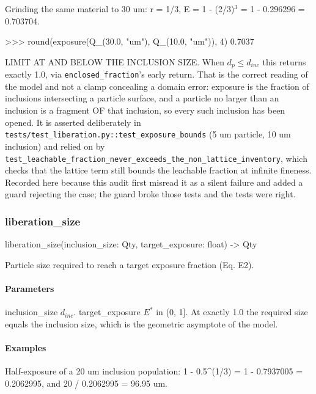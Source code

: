 \documentclass[10pt,a4paper,twoside]{report}
\begin{document}
Grinding the same material to 30 um: r = 1/3, E = 1 - (2/3)$^{3}$ = 1 - 0.296296 = 0.703704.

\begin{doctestblock}
>>> round(exposure(Q_(30.0, "um"), Q_(10.0, "um")), 4)
0.7037
\end{doctestblock}

LIMIT AT AND BELOW THE INCLUSION SIZE. When $d_p \le d_{inc}$ this returns exactly 1.0, via \texttt{enclosed\_fraction}'s early return. That is the correct reading of the model and not a clamp concealing a domain error: exposure is the fraction of inclusions intersecting a particle surface, and a particle no larger than an inclusion is a fragment OF that inclusion, so every such inclusion has been opened. It is asserted deliberately in \texttt{tests/test\_liberation.py::test\_exposure\_bounds} (5 um particle, 10 um inclusion) and relied on by \texttt{test\_leachable\_fraction\_never\_exceeds\_the\_non\_lattice\_inventory}, which checks that the lattice term still bounds the leachable fraction at infinite fineness. Recorded here because this audit first misread it as a silent failure and added a guard rejecting the case; the guard broke those tests and the tests were right.

\subsubsection*{liberation\_size}

\begin{verbatimsmall}
liberation_size(inclusion_size: Qty, target_exposure: float) -> Qty
\end{verbatimsmall}

Particle size required to reach a target exposure fraction (Eq. E2).

\paragraph*{Parameters}

inclusion\_size $d_{inc}$. target\_exposure $E^{*}$ in (0, 1]. At exactly 1.0 the required size equals the inclusion size, which is the geometric asymptote of the model.

\paragraph*{Examples}

Half-exposure of a 20 um inclusion population: 1 - 0.5\textasciicircum{}(1/3) = 1 - 0.7937005 = 0.2062995, and 20 / 0.2062995 = 96.95 um.
\end{document}
